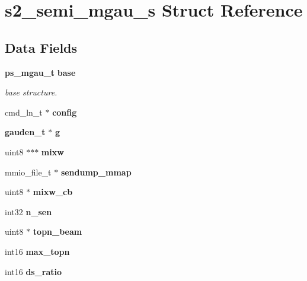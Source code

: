 \section{s2\+\_\+semi\+\_\+mgau\+\_\+s Struct Reference}
\label{structs2__semi__mgau__s}
\subsection*{Data Fields}
\begin{DoxyCompactItemize}
\item 
{\bf ps\+\_\+mgau\+\_\+t} {\bf base}
\begin{DoxyCompactList}\small\item\em base structure. \end{DoxyCompactList}\item 
cmd\+\_\+ln\+\_\+t $\ast$ {\bfseries config}\label{structs2__semi__mgau__s_ababf1e9522fb14c351df9a6b6d3957bc}

\item 
{\bf gauden\+\_\+t} $\ast$ {\bfseries g}\label{structs2__semi__mgau__s_ab9d5d5dcafa40af8869ceabb60a8d35b}

\item 
uint8 $\ast$$\ast$$\ast$ {\bfseries mixw}\label{structs2__semi__mgau__s_a1207b5db7e37e9477f3b55cc2d447050}

\item 
mmio\+\_\+file\+\_\+t $\ast$ {\bfseries sendump\+\_\+mmap}\label{structs2__semi__mgau__s_a66a60126fe057d36640cbf69f916bca3}

\item 
uint8 $\ast$ {\bfseries mixw\+\_\+cb}\label{structs2__semi__mgau__s_a20ec32cb8c38fb48909b2cc7c5412c3b}

\item 
int32 {\bfseries n\+\_\+sen}\label{structs2__semi__mgau__s_a021287621e71f8b74f23197d0efd1e9e}

\item 
uint8 $\ast$ {\bfseries topn\+\_\+beam}\label{structs2__semi__mgau__s_af530876b144ac13df103afe2ccdba2fc}

\item 
int16 {\bfseries max\+\_\+topn}\label{structs2__semi__mgau__s_adda80afc828a938dcdd08f976417d35a}

\item 
int16 {\bfseries ds\+\_\+ratio}\label{structs2__semi__mgau__s_a91b9da8bb484f4552ba0ff47cb262d17}


\end{DoxyCompactItemize}
